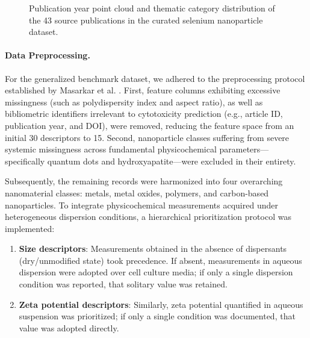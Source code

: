 \documentclass[letterpaper]{article}
\begin{document}
\begin{figure}[H]
  \vspace{0.8em}

  \caption{Publication year point cloud and thematic category distribution of the 43 source publications in the curated selenium nanoparticle dataset.}
  \label{fig:senp-literature-cloud}
\end{figure}

\paragraph{Data Preprocessing.}
For the generalized benchmark dataset, we adhered to the preprocessing protocol established by Masarkar et al. \cite{masarkar2024}. First, feature columns exhibiting excessive missingness (such as polydispersity index and aspect ratio), as well as bibliometric identifiers irrelevant to cytotoxicity prediction (e.g., article ID, publication year, and DOI), were removed, reducing the feature space from an initial 30 descriptors to 15. Second, nanoparticle classes suffering from severe systemic missingness across fundamental physicochemical parameters—specifically quantum dots and hydroxyapatite—were excluded in their entirety.

Subsequently, the remaining records were harmonized into four overarching nanomaterial classes: metals, metal oxides, polymers, and carbon-based nanoparticles. To integrate physicochemical measurements acquired under heterogeneous dispersion conditions, a hierarchical prioritization protocol was implemented:

\begin{enumerate}
  \item \textbf{Size descriptors}: Measurements obtained in the absence of dispersants (dry/unmodified state) took precedence. If absent, measurements in aqueous dispersion were adopted over cell culture media; if only a single dispersion condition was reported, that solitary value was retained.

  \item \textbf{Zeta potential descriptors}: Similarly, zeta potential quantified in aqueous suspension was prioritized; if only a single condition was documented, that value was adopted directly.
\end{enumerate}
\end{document}
